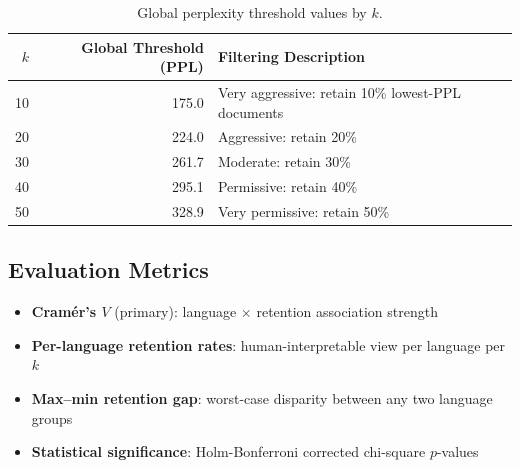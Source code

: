 \begin{table}[h]
\centering
\caption{Global perplexity threshold values by $k$.}
\label{tab:thresholds}
\begin{tabular}{rrl}
\toprule
$k$ & Global Threshold (PPL) & Filtering Description \\
\midrule
10 & 175.0 & Very aggressive: retain 10\% lowest-PPL documents \\
20 & 224.0 & Aggressive: retain 20\% \\
30 & 261.7 & Moderate: retain 30\% \\
40 & 295.1 & Permissive: retain 40\% \\
50 & 328.9 & Very permissive: retain 50\% \\
\bottomrule
\end{tabular}
\end{table}

\subsection{Evaluation Metrics}

\begin{itemize}
\item \textbf{Cram{\'e}r's $V$} (primary): language $\times$ retention association strength
\item \textbf{Per-language retention rates}: human-interpretable view per language per $k$
\item \textbf{Max--min retention gap}: worst-case disparity between any two language groups
\item \textbf{Statistical significance}: Holm-Bonferroni corrected chi-square $p$-values
\end{itemize}
